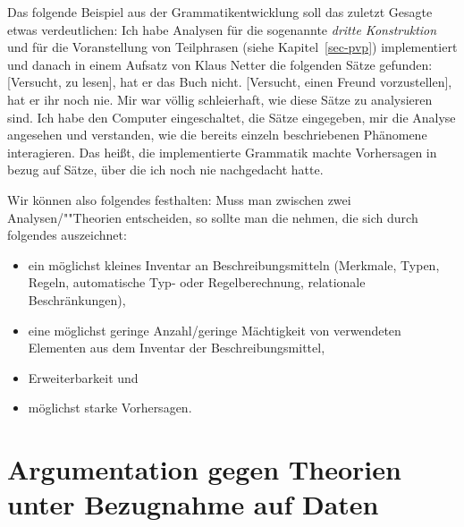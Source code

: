 Das folgende Beispiel aus der Grammatikentwicklung soll das zuletzt Gesagte etwas verdeutlichen:
Ich habe Analysen für die sogenannte \emph{dritte Konstruktion} und für die Voranstellung von Teilphrasen
(siehe Kapitel~\ref{sec-pvp}) implementiert und 
danach in einem Aufsatz von Klaus Netter \citeyearpar{Netter91} die folgenden Sätze gefunden:
\eal
\ex {}[Versucht, zu lesen], hat er das Buch nicht.
\ex {}[Versucht, einen Freund vorzustellen], hat er ihr noch nie.
\zl
Mir war völlig schleierhaft, wie diese Sätze zu analysieren sind. Ich habe den Computer eingeschaltet,
die Sätze eingegeben, mir die Analyse angesehen und verstanden, wie die bereits einzeln beschriebenen
Phänomene interagieren. Das heißt, die implementierte Grammatik machte Vorhersagen in bezug auf
Sätze, über die ich noch nie nachgedacht hatte.

Wir können also folgendes festhalten:
Muss man zwischen zwei Analysen/""Theorien entscheiden, so sollte man die nehmen, die sich durch folgendes
auszeichnet:
\begin{itemize}
\item ein möglichst kleines Inventar an Beschreibungsmitteln (Merkmale, Typen, Regeln, 
      automatische Typ- oder Regelberechnung, relationale Beschränkungen),
\item eine möglichst geringe Anzahl/geringe Mächtigkeit von verwendeten Elementen 
      aus dem Inventar der Beschreibungsmittel,
\item Erweiterbarkeit und
\item möglichst starke Vorhersagen.
\end{itemize}


\section{Argumentation gegen Theorien unter Bezugnahme auf Daten}

